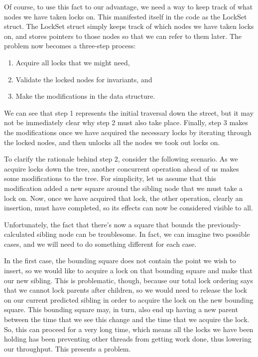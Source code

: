 \documentclass[10pt]{article}
\begin{document}
Of course, to use this fact to our advantage, we need a way to keep track of what nodes we have taken locks on. This manifested itself in the code as the LockSet struct. The LockSet struct simply keeps track of which nodes we have taken locks on, and stores pointers to those nodes so that we can refer to them later. The problem now becomes a three-step process:

\begin{enumerate}
\item Acquire all locks that we might need,
\item Validate the locked nodes for invariants, and
\item Make the modifications in the data structure.
\end{enumerate}

We can see that step 1 represents the initial traversal down the street, but it may not be immediately clear why step 2 must also take place. Finally, step 3 makes the modifications once we have acquired the necessary locks by iterating through the locked nodes, and then unlocks all the nodes we took out locks on.

To clarify the rationale behind step 2, consider the following scenario. As we acquire locks down the tree, another concurrent operation ahead of us makes some modifications to the tree. For simplicity, let us assume that this modification added a new square around the sibling node that we must take a lock on. Now, once we have acquired that lock, the other operation, clearly an insertion, must have completed, so its effects can now be considered visible to all.

Unfortunately, the fact that there's now a square that bounds the previously-calculated sibling node can be troublesome. In fact, we can imagine two possible cases, and we will need to do something different for each case.

In the first case, the bounding square does not contain the point we wish to insert, so we would like to acquire a lock on that bounding square and make that our new sibling. This is problematic, though, because our total lock ordering says that we cannot lock parents after children, so we would need to release the lock on our current predicted sibling in order to acquire the lock on the new bounding square. This bounding square may, in turn, also end up having a new parent between the time that we see this change and the time that we acquire the lock. So, this can proceed for a very long time, which means all the locks we have been holding has been preventing other threads from getting work done, thus lowering our throughput. This presents a problem.
\end{document}

